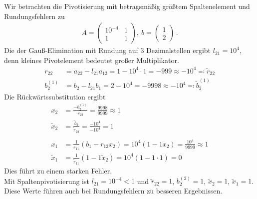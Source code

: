 \begin{Bspe}
  Wir betrachten die Pivotisierung mit betragsmäßig größtem Spaltenelement
  und Rundungsfehlern zu
  \begin{gather*}
    A=\begin{pmatrix}
      10^{-4} & 1 \\ 1 & 1
    \end{pmatrix}, ~
    b= \begin{pmatrix*}
      1 \\ 2
    \end{pmatrix*}\, .
  \end{gather*}
  Die der Gauß-Elimination mit Rundung auf 3 Dezimalstellen ergibt
  $l_{21}=10^4$, denn kleines Pivotelement bedeutet großer Multiplikator. \\
  \begin{align*}
    r_{22}&=a_{22}-l_{21}a_{12} = 1-10^4\cdot 1 = -999 \approx -10^4 \eqqcolon \widetilde{r}_{22}\\
    b_2^{(1)} & = b_2-l_{21}b_1 = 2-10^4 = -9998 \approx -10^4 \eqqcolon \widetilde{b}_2^{(1)} 
  \end{align*}
  Die Rückwärtssubstitution ergibt
  \begin{align*}
    x_2 &= \frac{-b_2^{(1)}}{r_{22}} = \frac{9998}{9999} \approx 1\\
    \widetilde{x}_	2 &= \frac{\widetilde{b}_2}{\widetilde{r}_{22}} = \frac{-10^4}{-10^4} = 1 \\\\
    x_1 &= \frac{1}{r_{11}}(b_1-r_{12}x_2)= 10^4 (1-1x_2) = \frac{10^4}{9999}\approx 1\\
    \widetilde{	x}_1 &= \frac{1}{\widetilde{r}_{11}}(1-1\widetilde{x}_2)= 10^4 (1-1\cdot 1) = 0 
  \end{align*}
  Dies führt zu einem starken Fehler.\\
  
  Mit Spaltenpivotisierung ist $l_{21}=10^{-4}<1$ und 
  $\widetilde{r}_{22}=1$, $b_2^{(2)} = 1$, $\widetilde{x}_2=1$, $\widetilde{x}_1=1$.\\
  Diese Werte führen auch bei Rundungsfehlern zu besseren Ergebnissen.
\end{Bspe}


